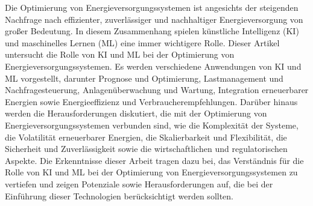 Die Optimierung von Energieversorgungssystemen ist angesichts der steigenden
Nachfrage nach effizienter, zuverlässiger und nachhaltiger Energieversorgung
von großer Bedeutung. In diesem Zusammenhang spielen künstliche Intelligenz
(KI) und maschinelles Lernen (ML) eine immer wichtigere Rolle. Dieser Artikel
untersucht die Rolle von KI und ML bei der Optimierung von
Energieversorgungssystemen. Es werden verschiedene Anwendungen von KI und ML
vorgestellt, darunter Prognose und Optimierung, Lastmanagement und
Nachfragesteuerung, Anlagenüberwachung und Wartung, Integration erneuerbarer
Energien sowie Energieeffizienz und Verbraucherempfehlungen. Darüber hinaus
werden die Herausforderungen diskutiert, die mit der Optimierung von
Energieversorgungssystemen verbunden sind, wie die Komplexität der Systeme, die
Volatilität erneuerbarer Energien, die Skalierbarkeit und Flexibilität, die
Sicherheit und Zuverlässigkeit sowie die wirtschaftlichen und regulatorischen
Aspekte. Die Erkenntnisse dieser Arbeit tragen dazu bei, das Verständnis für
die Rolle von KI und ML bei der Optimierung von Energieversorgungssystemen zu
vertiefen und zeigen Potenziale sowie Herausforderungen auf, die bei der
Einführung dieser Technologien berücksichtigt werden sollten.